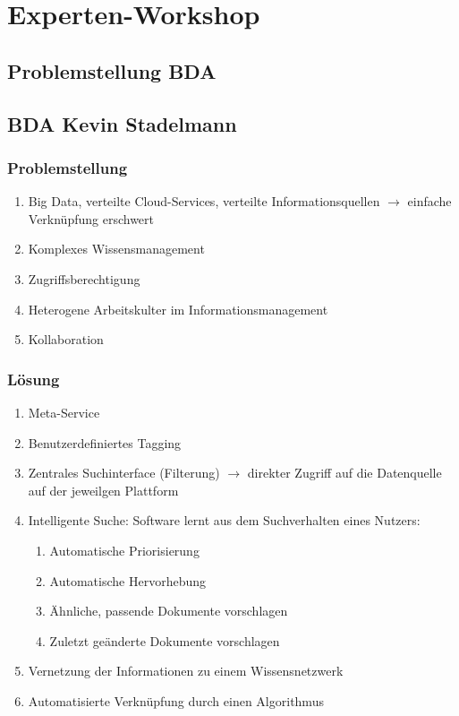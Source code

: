 \section{Experten-Workshop}

\subsection{Problemstellung BDA}



\subsection{BDA Kevin Stadelmann}

\subsubsection{Problemstellung}

\begin{enumerate}
    \item Big Data, verteilte Cloud-Services, verteilte Informationsquellen $\rightarrow$ einfache Verknüpfung erschwert
    \item Komplexes Wissensmanagement
    \item Zugriffsberechtigung
    \item Heterogene Arbeitskulter im Informationsmanagement
    \item Kollaboration
\end{enumerate}

\subsubsection{Lösung}

\begin{enumerate}
    \item Meta-Service
    \item Benutzerdefiniertes Tagging
    \item Zentrales Suchinterface (Filterung) $\rightarrow$ direkter Zugriff auf die Datenquelle auf der jeweilgen Plattform
    \item Intelligente Suche: Software lernt aus dem Suchverhalten eines Nutzers:
    \begin{enumerate}
        \item Automatische Priorisierung
        \item Automatische Hervorhebung
        \item Ähnliche, passende Dokumente vorschlagen
        \item Zuletzt geänderte Dokumente vorschlagen
    \end{enumerate}
    \item Vernetzung der Informationen zu einem Wissensnetzwerk
    \item Automatisierte Verknüpfung durch einen Algorithmus
\end{enumerate}

